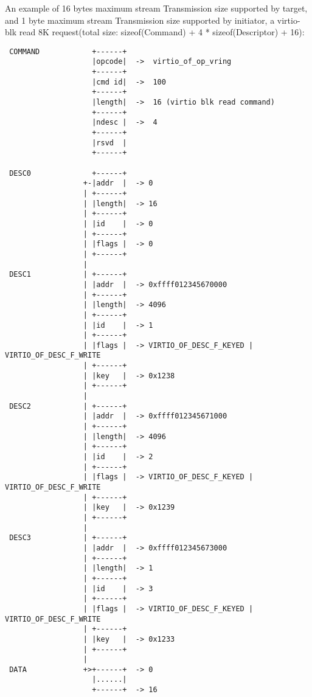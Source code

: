 An example of 16 bytes maximum stream Transmission size supported by target, and 1 byte maximum stream Transmission size supported by initiator, a virtio-blk read 8K request(total size: sizeof(Command) + 4 * sizeof(Descriptor) + 16):
\begin{lstlisting}
 COMMAND            +------+
                    |opcode|  ->  virtio_of_op_vring
                    +------+
                    |cmd id|  ->  100
                    +------+
                    |length|  ->  16 (virtio blk read command)
                    +------+
                    |ndesc |  ->  4
                    +------+
                    |rsvd  |
                    +------+

 DESC0              +------+
                  +-|addr  |  -> 0
                  | +------+
                  | |length|  -> 16
                  | +------+
                  | |id    |  -> 0
                  | +------+
                  | |flags |  -> 0
                  | +------+
                  |
 DESC1            | +------+
                  | |addr  |  -> 0xffff012345670000
                  | +------+
                  | |length|  -> 4096
                  | +------+
                  | |id    |  -> 1
                  | +------+
                  | |flags |  -> VIRTIO_OF_DESC_F_KEYED | VIRTIO_OF_DESC_F_WRITE
                  | +------+
                  | |key   |  -> 0x1238
                  | +------+
                  |
 DESC2            | +------+
                  | |addr  |  -> 0xffff012345671000
                  | +------+
                  | |length|  -> 4096
                  | +------+
                  | |id    |  -> 2
                  | +------+
                  | |flags |  -> VIRTIO_OF_DESC_F_KEYED | VIRTIO_OF_DESC_F_WRITE
                  | +------+
                  | |key   |  -> 0x1239
                  | +------+
                  |
 DESC3            | +------+
                  | |addr  |  -> 0xffff012345673000
                  | +------+
                  | |length|  -> 1
                  | +------+
                  | |id    |  -> 3
                  | +------+
                  | |flags |  -> VIRTIO_OF_DESC_F_KEYED | VIRTIO_OF_DESC_F_WRITE
                  | +------+
                  | |key   |  -> 0x1233
                  | +------+
                  |
 DATA             +>+------+  -> 0
                    |......|
                    +------+  -> 16
\end{lstlisting}

